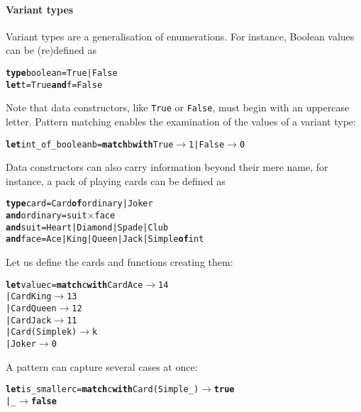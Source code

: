 \paragraph{Variant types}

Variant types are a generalisation of enumerations. For instance,
Boolean values can be (re)defined as
\begin{alltt}
\textbf{type} boolean = True | False
\textbf{let} t = True \textbf{and} f = False
\end{alltt}
Note that data constructors, like \texttt{True} or
\texttt{False}, must begin with an uppercase letter. Pattern matching
enables the examination of the values of a variant type:
\begin{alltt}
\textbf{let} int\_of\_boolean b = \textbf{match} b \textbf{with} True  \(\rightarrow\) 1 | False \(\rightarrow\) 0
\end{alltt}
Data constructors can also carry information beyond their mere name,
for instance, a pack of playing cards can be defined as
\begin{alltt}
\textbf{type} card = Card \textbf{of} ordinary | Joker
\textbf{and} ordinary = suit \(\times\) face
\textbf{and} suit = Heart | Diamond | Spade | Club
\textbf{and} face = Ace | King | Queen | Jack | Simple \textbf{of} int
\end{alltt}

\noindent Let us define the cards and functions creating them:

\bigskip

\noindent{}

\noindent{}

\medskip

\noindent{}

\noindent{}

\medskip

\noindent{}

\noindent{}

\begin{alltt}
\textbf{let} value c = \textbf{match} c \textbf{with} Card Ace        \(\rightarrow\) 14
                         | Card King       \(\rightarrow\) 13
                         | Card Queen      \(\rightarrow\) 12
                         | Card Jack       \(\rightarrow\) 11
                         | Card (Simple k) \(\rightarrow\) k
                         | Joker           \(\rightarrow\) 0
\end{alltt}
A pattern can capture several cases at once:
\begin{alltt}
\textbf{let} is\_smaller c = \textbf{match} c \textbf{with} Card (Simple \_) \(\rightarrow\) \textbf{true}
                              | \_ \(\rightarrow\) \textbf{false}
\end{alltt}

